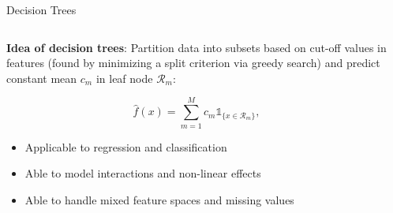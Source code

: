 \documentclass[11pt,compress,t,notes=noshow, aspectratio=169, xcolor=table]{beamer}
\begin{document}
\begin{frame}{Decision Trees }


\begin{columns}[T]

\begin{column}{0.7\textwidth}
\textbf{Idea of decision trees}: 
Partition data into subsets based on cut-off values in features (found by minimizing a split criterion via greedy search) and predict constant mean $c_m$ in leaf node $\mathcal{R}_m$:

$$
\hat f(x) = \sum_{m=1}^M c_m \mathds{1}_{\{x \in \mathcal{R}_m\}},
$$

\pause
\begin{itemize}
    \item Applicable to regression and classification
    \item Able to model interactions and non-linear effects
    \item Able to handle mixed feature spaces and missing values
\end{itemize}

\end{column}
\begin{column}{0.3\textwidth}

\end{column}
\end{columns}
\end{frame}
\end{document}
